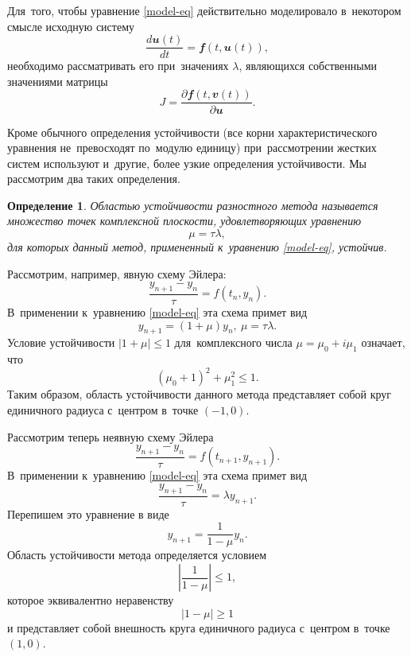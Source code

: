 \documentclass[11pt,a4paper,twoside,listtotoc,bibtotoc]{report}
\numberwithin{equation}{section}
\newtheorem*{definition}{Определение}
\theoremstyle{definition}
\theoremstyle{plain}
\newcommand{\vfunc}[1]{\mathbfit{#1}}
\begin{document}
Для~того, чтобы уравнение \eqref{model-eq} действительно моделировало в~некотором
смысле исходную систему
%
$$
    \dfrac{d\vfunc{u}(t)}{dt}=\vfunc{f}(t, \vfunc{u}(t)),
$$
%
необходимо рассматривать его при~значениях $\lambda$, являющихся собственными
значениями матрицы
%
$$
    J=\dfrac{\partial\vfunc{f}(t,\vfunc{v}(t))}{\partial\vfunc{u}}.
$$
%

Кроме обычного определения устойчивости (все корни характеристического уравнения
не~превосходят по~модулю единицу) при~рассмотрении жестких систем используют
и~другие, более узкие определения устойчивости. Мы рассмотрим два таких определения.

\begin{definition}
    Областью устойчивости разностного метода называется множество точек
    комплексной плоскости, удовлетворяющих уравнению
    $$
        \mu = \tau\lambda,
    $$
    для которых данный метод, примененный к~уравнению \eqref{model-eq}, устойчив.
\end{definition}

Рассмотрим, например, явную схему Эйлера:
%
$$
    \dfrac{y_{n+1}-y_n}{\tau} = f(t_n, y_n).
$$
%
В~применении к~уравнению \eqref{model-eq} эта схема примет вид
%
$$
    y_{n+1}=\left(1+\mu\right)y_n,~\mu=\tau\lambda.
$$
%
Условие устойчивости $|1+\mu|\leqslant 1$ для~комплексного числа
$\mu=\mu_0+i\mu_1$ означает, что
%
$$
    (\mu_0+1)^2+\mu_1^2\leqslant 1.
$$
%
Таким образом, область устойчивости данного метода представляет собой круг
единичного радиуса с~центром в~точке $(-1, 0)$.

%
\begin{figure}[H]
    \centering
\end{figure}
%

Рассмотрим теперь неявную схему Эйлера
%
$$
    \dfrac{y_{n+1}-y_n}{\tau}=f(t_{n+1}, y_{n+1}).
$$
%
В~применении к~уравнению \eqref{model-eq} эта схема примет вид
%
$$
    \dfrac{y_{n+1}-y_n}{\tau} = \lambda y_{n+1}.
$$
%
Перепишем это уравнение в виде
%
$$
    y_{n+1}=\dfrac{1}{1-\mu}y_n.
$$
%
Область устойчивости метода определяется условием
%
$$
    \left|\dfrac{1}{1-\mu}\right|\leqslant 1,
$$
%
которое эквивалентно неравенству
%
$$
    \left|1-\mu\right|\geqslant 1
$$
%
и представляет собой внешность круга единичного радиуса с~центром в~точке
$(1, 0)$.
\end{document}
